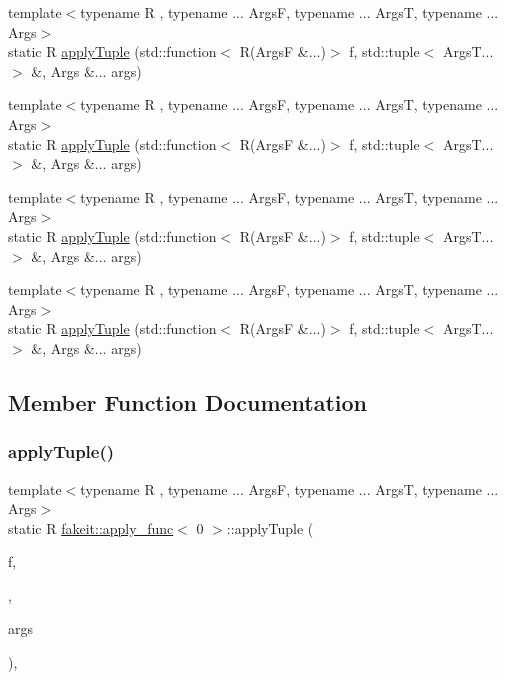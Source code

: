 \begin{DoxyCompactItemize}
\item 
{\footnotesize template$<$typename R , typename ... ArgsF, typename ... ArgsT, typename ... Args$>$ }\\static R \mbox{\hyperlink{structfakeit_1_1apply__func_3_010_01_4_acd870ee59c5ea1915b734577bbbcb831}{apply\+Tuple}} (std\+::function$<$ R(ArgsF \&...)$>$ f, std\+::tuple$<$ Args\+T... $>$ \&, Args \&... args)
\item 
{\footnotesize template$<$typename R , typename ... ArgsF, typename ... ArgsT, typename ... Args$>$ }\\static R \mbox{\hyperlink{structfakeit_1_1apply__func_3_010_01_4_acd870ee59c5ea1915b734577bbbcb831}{apply\+Tuple}} (std\+::function$<$ R(ArgsF \&...)$>$ f, std\+::tuple$<$ Args\+T... $>$ \&, Args \&... args)
\item 
{\footnotesize template$<$typename R , typename ... ArgsF, typename ... ArgsT, typename ... Args$>$ }\\static R \mbox{\hyperlink{structfakeit_1_1apply__func_3_010_01_4_acd870ee59c5ea1915b734577bbbcb831}{apply\+Tuple}} (std\+::function$<$ R(ArgsF \&...)$>$ f, std\+::tuple$<$ Args\+T... $>$ \&, Args \&... args)
\item 
{\footnotesize template$<$typename R , typename ... ArgsF, typename ... ArgsT, typename ... Args$>$ }\\static R \mbox{\hyperlink{structfakeit_1_1apply__func_3_010_01_4_acd870ee59c5ea1915b734577bbbcb831}{apply\+Tuple}} (std\+::function$<$ R(ArgsF \&...)$>$ f, std\+::tuple$<$ Args\+T... $>$ \&, Args \&... args)
\end{DoxyCompactItemize}


\subsection{Member Function Documentation}
\mbox{\label{structfakeit_1_1apply__func_3_010_01_4_acd870ee59c5ea1915b734577bbbcb831}} 
\subsubsection{\texorpdfstring{applyTuple()}{applyTuple()}\hspace{0.1cm}{\footnotesize\ttfamily [1/9]}}
{\footnotesize\ttfamily template$<$typename R , typename ... ArgsF, typename ... ArgsT, typename ... Args$>$ \\
static R \mbox{\hyperlink{structfakeit_1_1apply__func}{fakeit\+::apply\+\_\+func}}$<$ 0 $>$\+::apply\+Tuple (\begin{DoxyParamCaption}\item[{std\+::function$<$ R(ArgsF \&...)$>$}]{f,  }\item[{std\+::tuple$<$ Args\+T... $>$ \&}]{,  }\item[{Args \&...}]{args }\end{DoxyParamCaption})\hspace{0.3cm}{\ttfamily [inline]}, {\ttfamily [static]}}

